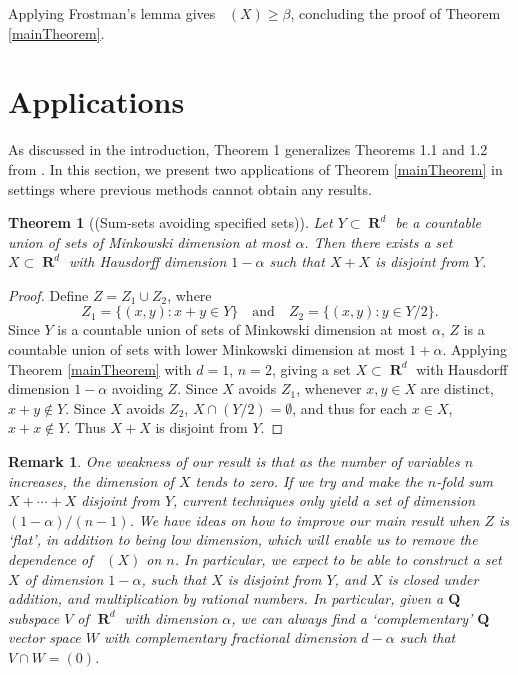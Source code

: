 \documentclass[dvipsnames,letterpaper,12pt]{article}
\numberwithin{equation}{section}
\theoremstyle{plain}
\newtheorem{theorem}{Theorem}
\newtheorem*{remark}{Remark}
\DeclareMathOperator{\hausdim}{\dim_{\mathbf{H}}}
\DeclareMathOperator{\RR}{\mathbf{R}}
\begin{document}
Applying Frostman's lemma gives $\hausdim(X) \geq \beta$, concluding the proof of Theorem \ref{mainTheorem}.









\section{Applications}\label{applications}

As discussed in the introduction, Theorem 1 generalizes Theorems 1.1 and 1.2 from \cite{MalabikaRob}. In this section, we present two applications of Theorem \ref{mainTheorem} in settings where previous methods cannot obtain any results.

\begin{theorem}[(Sum-sets avoiding specified sets)]
	Let $Y \subset \RR^d$ be a countable union of sets of Minkowski dimension at most $\alpha$. Then there exists a set $X \subset \RR^d$ with Hausdorff dimension $1 - \alpha$ such that $X + X$ is disjoint from $Y$.
\end{theorem}
\begin{proof}
	Define $Z = Z_1 \cup Z_2$, where
	\[ Z_1 = \{ (x,y) : x + y \in Y \} \quad \text{and} \quad Z_2 = \{ (x,y): y \in Y/2 \}. \]
	Since $Y$ is a countable union of sets of Minkowski dimension at most $\alpha$, $Z$ is a countable union of sets with lower Minkowski dimension at most $1 + \alpha$. Applying Theorem \ref{mainTheorem} with $d = 1$, $n = 2$, giving a set $X \subset \RR^d$ with Hausdorff dimension $1 - \alpha$ avoiding $Z$. Since $X$ avoids $Z_1$, whenever $x,y \in X$ are distinct, $x + y \not \in Y$. Since $X$ avoids $Z_2$, $X \cap (Y/2) = \emptyset$, and thus for each $x \in X$, $x + x \not \in Y$. Thus $X + X$ is disjoint from $Y$.
\end{proof}

\begin{remark}
	One weakness of our result is that as the number of variables $n$ increases, the dimension of $X$ tends to zero. If we try and make the $n$-fold sum $X + \cdots + X$ disjoint from $Y$, current techniques only yield a set of dimension $(1 - \alpha)/(n-1)$. We have ideas on how to improve our main result when $Z$ is `flat', in addition to being low dimension, which will enable us to remove the dependence of $\hausdim(X)$ on $n$. In particular, we expect to be able to construct a set $X$ of dimension $1 - \alpha$, such that $X$ is disjoint from $Y$, and $X$ is closed under addition, and multiplication by rational numbers. In particular, given a $\mathbf{Q}$ subspace $V$ of $\RR^d$ with dimension $\alpha$, we can always find a `complementary' $\mathbf{Q}$ vector space $W$ with complementary fractional dimension $d - \alpha$ such that $V \cap W = (0)$.
\end{remark}
\end{document}
